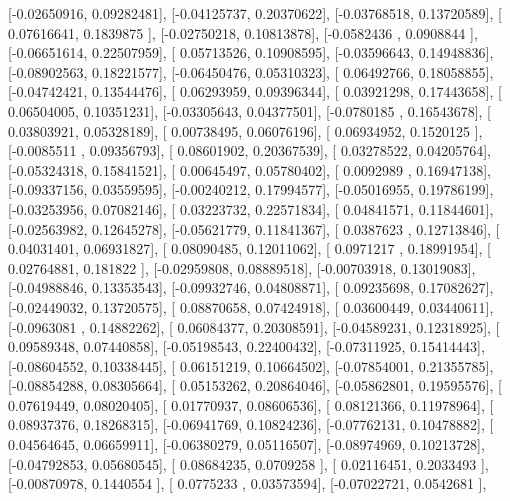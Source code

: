 \documentclass{article}
\begin{document}
       [-0.02650916,  0.09282481],
       [-0.04125737,  0.20370622],
       [-0.03768518,  0.13720589],
       [ 0.07616641,  0.1839875 ],
       [-0.02750218,  0.10813878],
       [-0.0582436 ,  0.0908844 ],
       [-0.06651614,  0.22507959],
       [ 0.05713526,  0.10908595],
       [-0.03596643,  0.14948836],
       [-0.08902563,  0.18221577],
       [-0.06450476,  0.05310323],
       [ 0.06492766,  0.18058855],
       [-0.04742421,  0.13544476],
       [ 0.06293959,  0.09396344],
       [ 0.03921298,  0.17443658],
       [ 0.06504005,  0.10351231],
       [-0.03305643,  0.04377501],
       [-0.0780185 ,  0.16543678],
       [ 0.03803921,  0.05328189],
       [ 0.00738495,  0.06076196],
       [ 0.06934952,  0.1520125 ],
       [-0.0085511 ,  0.09356793],
       [ 0.08601902,  0.20367539],
       [ 0.03278522,  0.04205764],
       [-0.05324318,  0.15841521],
       [ 0.00645497,  0.05780402],
       [ 0.0092989 ,  0.16947138],
       [-0.09337156,  0.03559595],
       [-0.00240212,  0.17994577],
       [-0.05016955,  0.19786199],
       [-0.03253956,  0.07082146],
       [ 0.03223732,  0.22571834],
       [ 0.04841571,  0.11844601],
       [-0.02563982,  0.12645278],
       [-0.05621779,  0.11841367],
       [ 0.0387623 ,  0.12713846],
       [ 0.04031401,  0.06931827],
       [ 0.08090485,  0.12011062],
       [ 0.0971217 ,  0.18991954],
       [ 0.02764881,  0.181822  ],
       [-0.02959808,  0.08889518],
       [-0.00703918,  0.13019083],
       [-0.04988846,  0.13353543],
       [-0.09932746,  0.04808871],
       [ 0.09235698,  0.17082627],
       [-0.02449032,  0.13720575],
       [ 0.08870658,  0.07424918],
       [ 0.03600449,  0.03440611],
       [-0.0963081 ,  0.14882262],
       [ 0.06084377,  0.20308591],
       [-0.04589231,  0.12318925],
       [ 0.09589348,  0.07440858],
       [-0.05198543,  0.22400432],
       [-0.07311925,  0.15414443],
       [-0.08604552,  0.10338445],
       [ 0.06151219,  0.10664502],
       [-0.07854001,  0.21355785],
       [-0.08854288,  0.08305664],
       [ 0.05153262,  0.20864046],
       [-0.05862801,  0.19595576],
       [ 0.07619449,  0.08020405],
       [ 0.01770937,  0.08606536],
       [ 0.08121366,  0.11978964],
       [ 0.08937376,  0.18268315],
       [-0.06941769,  0.10824236],
       [-0.07762131,  0.10478882],
       [ 0.04564645,  0.06659911],
       [-0.06380279,  0.05116507],
       [-0.08974969,  0.10213728],
       [-0.04792853,  0.05680545],
       [ 0.08684235,  0.0709258 ],
       [ 0.02116451,  0.2033493 ],
       [-0.00870978,  0.1440554 ],
       [ 0.0775233 ,  0.03573594],
       [-0.07022721,  0.0542681 ],
\end{document}
